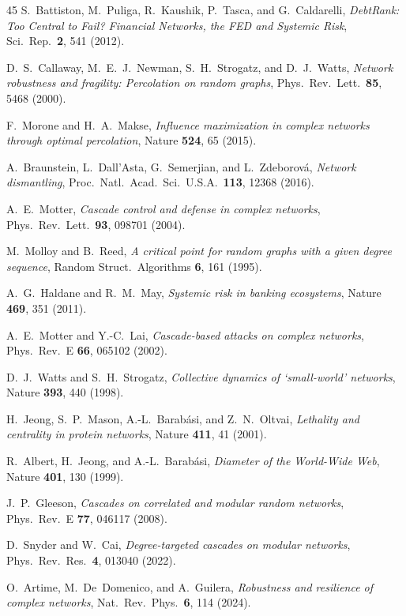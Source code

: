 \documentclass[aps,pre,twocolumn,superscriptaddress,showpacs]{revtex4-2}
\begin{document}
\begin{thebibliography}{45}
S.~Battiston, M.~Puliga, R.~Kaushik, P.~Tasca, and G.~Caldarelli,
\emph{DebtRank: Too Central to Fail? Financial Networks, the FED and Systemic Risk},
Sci.\ Rep.\ \textbf{2}, 541 (2012).

D.~S.~Callaway, M.~E.~J.~Newman, S.~H.~Strogatz, and D.~J.~Watts,
\emph{Network robustness and fragility: Percolation on random graphs},
Phys.\ Rev.\ Lett.\ \textbf{85}, 5468 (2000).

F.~Morone and H.~A.~Makse,
\emph{Influence maximization in complex networks through optimal percolation},
Nature \textbf{524}, 65 (2015).

A.~Braunstein, L.~Dall'Asta, G.~Semerjian, and L.~Zdeborov\'a,
\emph{Network dismantling},
Proc.\ Natl.\ Acad.\ Sci.\ U.S.A.\ \textbf{113}, 12368 (2016).

A.~E.~Motter,
\emph{Cascade control and defense in complex networks},
Phys.\ Rev.\ Lett.\ \textbf{93}, 098701 (2004).

M.~Molloy and B.~Reed,
\emph{A critical point for random graphs with a given degree sequence},
Random Struct.\ Algorithms \textbf{6}, 161 (1995).

A.~G.~Haldane and R.~M.~May,
\emph{Systemic risk in banking ecosystems},
Nature \textbf{469}, 351 (2011).

A.~E.~Motter and Y.-C.~Lai,
\emph{Cascade-based attacks on complex networks},
Phys.\ Rev.\ E \textbf{66}, 065102 (2002).

D.~J.~Watts and S.~H.~Strogatz,
\emph{Collective dynamics of `small-world' networks},
Nature \textbf{393}, 440 (1998).

H.~Jeong, S.~P.~Mason, A.-L.~Barab\'asi, and Z.~N.~Oltvai,
\emph{Lethality and centrality in protein networks},
Nature \textbf{411}, 41 (2001).

R.~Albert, H.~Jeong, and A.-L.~Barab\'asi,
\emph{Diameter of the World-Wide Web},
Nature \textbf{401}, 130 (1999).

J.~P.~Gleeson,
\emph{Cascades on correlated and modular random networks},
Phys.\ Rev.\ E \textbf{77}, 046117 (2008).

D.~Snyder and W.~Cai,
\emph{Degree-targeted cascades on modular networks},
Phys.\ Rev.\ Res.\ \textbf{4}, 013040 (2022).

O.~Artime, M.~De~Domenico, and A.~Guilera,
\emph{Robustness and resilience of complex networks},
Nat.\ Rev.\ Phys.\ \textbf{6}, 114 (2024).


\end{thebibliography}
\end{document}
